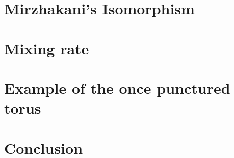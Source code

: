\documentclass[12pt]{article}
\theoremstyle{plain}%
\theoremstyle{definition}
\theoremstyle{remark}
\begin{document}
\section{Mirzhakani's Isomorphism}

\newpage

\section{Mixing rate}

\newpage

\section{Example of the once punctured torus}

\newpage

\section{Conclusion}

\newpage



\end{document}
